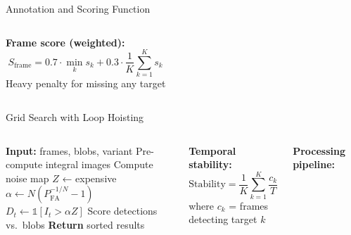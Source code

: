 \documentclass[aspectratio=169, 10pt]{beamer}
\begin{document}
\begin{frame}{Annotation and Scoring Function}
\begin{columns}[T]
\vspace{0.2cm}
\textbf{Frame score (weighted):}
\begin{equation*}
    S_{\mathrm{frame}} = 0.7 \cdot \min_k s_k + 0.3 \cdot \frac{1}{K}\sum_{k=1}^{K} s_k
\end{equation*}
\vspace{-0.1cm}
Heavy penalty for missing any target
\end{columns}
\end{frame}

\begin{frame}{Grid Search with Loop Hoisting}
\small
\begin{columns}[T]
\begin{algorithm}[H]
\scriptsize
\caption{Optimized Grid Search}
\begin{algorithmic}[1]
\STATE \textbf{Input:} frames, blobs, variant
\STATE Pre-compute integral images
    \STATE Compute noise map $Z$ \alert{← expensive}
        \STATE $\alpha \leftarrow N(P_{\mathrm{FA}}^{-1/N} - 1)$
        \STATE $D_t \leftarrow \mathbb{1}[I_t > \alpha Z]$
        \STATE Score detections vs.\ blobs
    \ENDFOR
\ENDFOR
\STATE \textbf{Return} sorted results
\end{algorithmic}
\end{algorithm}

\vspace{0.1cm}
\textbf{Temporal stability:}
\begin{equation*}
    \mathrm{Stability} = \frac{1}{K}\sum_{k=1}^{K} \frac{c_k}{T}
\end{equation*}
\vspace{-0.1cm}
where $c_k$ = frames detecting target $k$

\textbf{Processing pipeline:}
\begin{center}
\end{center}
\end{columns}
\end{frame}
\end{document}
